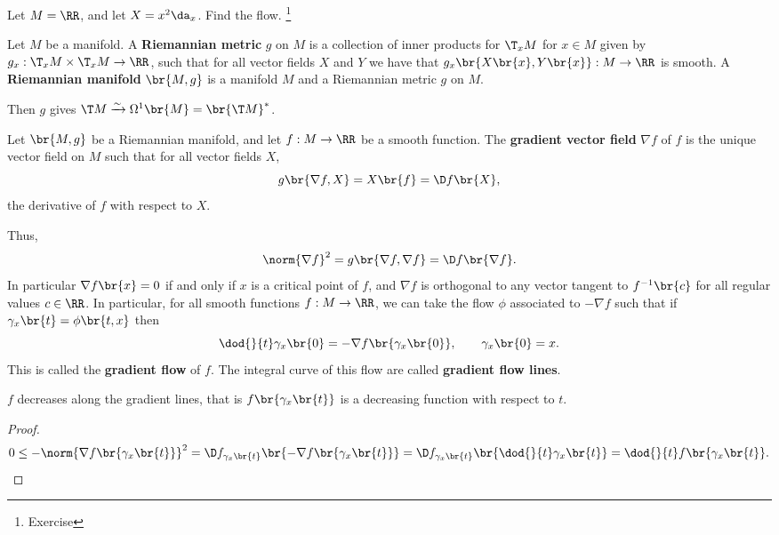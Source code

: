 \begin{example*}
Let $ M = \RR $, and let $ X = x^2\da_x $. Find the flow. \footnote{Exercise}
\end{example*}

\pagebreak

\begin{definition}
Let $ M $ be a manifold. A \textbf{Riemannian metric} $ g $ on $ M $ is a collection of inner products for $ \T_xM $ for $ x \in M $ given by $ g_x : \T_xM \times \T_xM \to \RR $, such that for all vector fields $ X $ and $ Y $ we have that $ g_x\br{X\br{x}, Y\br{x}} : M \to \RR $ is smooth. A \textbf{Riemannian manifold} $ \br{M, g} $ is a manifold $ M $ and a Riemannian metric $ g $ on $ M $.
\end{definition}

Then $ g $ gives $ \T M \xrightarrow{\sim} \Omega^1\br{M} = \br{\T M}^* $.

\begin{definition}
Let $ \br{M, g} $ be a Riemannian manifold, and let $ f : M \to \RR $ be a smooth function. The \textbf{gradient vector field} $ \nabla f $ of $ f $ is the unique vector field on $ M $ such that for all vector fields $ X $,
$$ g\br{\nabla f, X} = X\br{f} = \D f\br{X}, $$
the derivative of $ f $ with respect to $ X $.
\end{definition}

Thus,
$$ \norm{\nabla f}^2 = g\br{\nabla f, \nabla f} = \D f\br{\nabla f}. $$
In particular $ \nabla f\br{x} = 0 $ if and only if $ x $ is a critical point of $ f $, and $ \nabla f $ is orthogonal to any vector tangent to $ f^{-1}\br{c} $ for all regular values $ c \in \RR $. In particular, for all smooth functions $ f : M \to \RR $, we can take the flow $ \phi $ associated to $ -\nabla f $ such that if $ \gamma_x\br{t} = \phi\br{t, x} $ then
$$ \dod{}{t}\gamma_x\br{0} = -\nabla f\br{\gamma_x\br{0}}, \qquad \gamma_x\br{0} = x. $$
This is called the \textbf{gradient flow} of $ f $. The integral curve of this flow are called \textbf{gradient flow lines}.

\begin{lemma}
$ f $ decreases along the gradient lines, that is $ f\br{\gamma_x\br{t}} $ is a decreasing function with respect to $ t $.
\end{lemma}

\begin{proof}
$$ 0 \le -\norm{\nabla f\br{\gamma_x\br{t}}}^2 = \D f_{\gamma_x\br{t}}\br{-\nabla f\br{\gamma_x\br{t}}} = \D f_{\gamma_x\br{t}}\br{\dod{}{t}\gamma_x\br{t}} = \dod{}{t}f\br{\gamma_x\br{t}}. $$
\end{proof}


